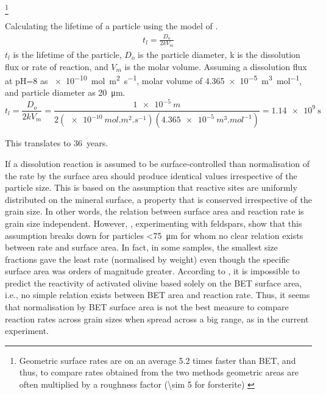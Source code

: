 \footnote{Geometric surface rates are on an average 5.2 times faster than BET, and thus, to compare rates obtained from the two methods geometric areas are often multiplied by a roughness factor (\num{\sim 5} for forsterite) \citep{rimstidt2012}}

\begin{mdframed}[leftmargin=10pt,rightmargin=10pt]
Calculating the lifetime of a particle using the model of \cite{lasaga2014}.
\begin{align}
t_l=\frac{D_o}{2kV_m}
\end{align}
$t_l$ is the lifetime of the particle, $D_o$ is the particle diameter, k is the dissolution flux or rate of reaction, and $V_m$ is the molar volume. Assuming a dissolution flux at pH=8 as \SI{e-10}{mol.m^{2}.s^{-1}}, molar volume  of \SI{4.365e-5}{m^{3}.mol^{-1}}, and particle diameter as \SI{20}{\micro\meter}.
\begin{equation}
t_l=\frac{D_o}{2kV_m}=\frac{\SI{1e-5}{m}}{2\left(\SI{e-10}{mol.m^{2}.s^{-1}}\right)\left(\SI{4.365e-5}{m^{3}.mol^{-1}}\right)}=\SI{1.14e9}{\second}
\label{eq:lifetime}
\end{equation}

This translates to \SI{36}{years}. 
\end{mdframed}


If a dissolution reaction is assumed to be surface-controlled than normalisation of the rate by the surface area should produce identical values irrespective of the particle size. This is based on the assumption that reactive sites are uniformly distributed on the mineral surface, a property that is conserved irrespective of the grain size. In other words, the relation between surface area and reaction rate is grain size independent. However, \cite{holdren1987}, experimenting with feldspars, show that this assumption breaks down for particles \SI{<75}{\micro\meter} for whom no clear relation exists between rate and surface area. In fact, in some samples, the smallest size fractions gave the least rate (normalised by weight) even though the specific surface area was orders of magnitude greater. According to \cite{kleiv2006}, it is impossible to predict the reactivity of activated olivine based solely on the BET surface area, i.e., no simple relation exists between BET area and reaction rate. Thus, it seems that normalisation by BET surface area is not the best measure to compare reaction rates across grain sizes when spread across a big range, as in the current experiment. 